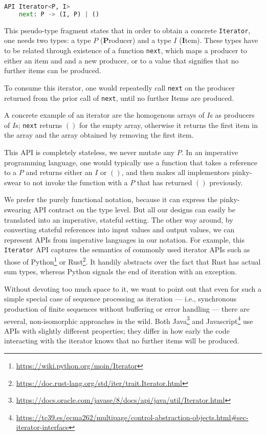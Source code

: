 \documentclass[sigplan,screen,10pt,anonymous,review]{acmart}
\begin{document}
\begin{lstlisting}[language=Python]
API Iterator<P, I>
    next: P -> (I, P) | ()
\end{lstlisting}

This pseudo-type fragment states that in order to obtain a concrete \texttt{Iterator}, one needs two types: a type $P$ (\textbf{P}roducer) and a type $I$ (\textbf{I}tem). These types have to be related through existence of a function \texttt{next}, which maps a producer to either an item and and a new producer, or to a value that signifies that no further items can be produced.

To consume this iterator, one would repeatedly call \texttt{next} on the producer returned from the prior call of \texttt{next}, until no further Items are produced.

A concrete example of an iterator are the homogenous arrays of $I$s as producers of $I$s; \texttt{next} returns $()$ for the empty array, otherwise it returns the first item in the array and the array obtained by removing the first item.

This API is completely stateless, we never mutate any $P$. In an imperative programming language, one would typically use a function that takes a reference to a $P$ and returns either an $I$ or $()$, and then makes all implementors pinky-swear to not invoke the function with a $P$ that has returned $()$ previously.

We prefer the purely functional notation, because it can express the pinky-swearing API contract on the type level. But all our designs can easily be translated into an imperative, stateful setting. The other way around, by converting stateful references into input values and output values, we can represent APIs from imperative languages in our notation. For example, this \texttt{Iterator} API captures the semantics of commonly used iterator APIs such as those of Python\footnote{\url{https://wiki.python.org/moin/Iterator}} or Rust\footnote{\url{https://doc.rust-lang.org/std/iter/trait.Iterator.html}}. It handily abstracts over the fact that Rust has actual sum types, whereas Python signals the end of iteration with an exception.

Without devoting too much space to it, we want to point out that even for such a simple special case of sequence processing as iteration --- i.e., synchronous production of finite sequences without buffering or error handling --- there are several, non-isomorphic approaches in the wild. Both Java\footnote{\url{https://docs.oracle.com/javase/8/docs/api/java/util/Iterator.html}} and Javascript\footnote{\url{https://tc39.es/ecma262/multipage/control-abstraction-objects.html\#sec-iterator-interface}} use APIs with slightly different properties; they differ in how early the code interacting with the iterator knows that no further items will be produced.
\end{document}
